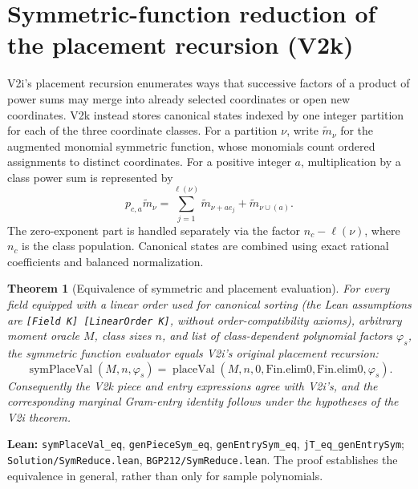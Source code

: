\documentclass[11pt]{article}
\newtheorem{theorem}{Theorem}[section]
\newcommand{\code}[1]{\texttt{#1}}
\begin{document}
\section{Symmetric-function reduction of the placement recursion (V2k)}\label{sec:v2k}
V2i's placement recursion enumerates ways that successive factors of a
product of power sums may merge into already selected coordinates or open
new coordinates. V2k instead stores canonical states indexed by one integer
partition for each of the three coordinate classes. For a partition $\nu$,
write $\widetilde m_\nu$ for the augmented monomial symmetric function,
whose monomials count ordered assignments to distinct coordinates. For a
positive integer $a$, multiplication by a class power sum is represented by
\begin{equation}\label{eq:v2k-transition}
 p_{c,a}\widetilde m_\nu
 =\sum_{j=1}^{\ell(\nu)}\widetilde m_{\nu+a e_j}
  +\widetilde m_{\nu\cup(a)}.
\end{equation}
The zero-exponent part is handled separately via the factor
$n_c-\ell(\nu)$, where $n_c$ is the class population. Canonical states
are combined using exact rational coefficients and balanced normalization.

\begin{theorem}[Equivalence of symmetric and placement evaluation]\label{thm:v2k-sym}
For every field equipped with a linear order used for canonical sorting
(the Lean assumptions are \code{[Field K] [LinearOrder K]}, without
order-compatibility axioms), arbitrary moment oracle $M$, class sizes $n$,
and list of class-dependent polynomial factors $\varphi_s$, the symmetric
function evaluator equals V2i's original placement recursion:
\[
 \operatorname{symPlaceVal}(M,n,\varphi_s)
 =\operatorname{placeVal}(M,n,0,\mathrm{Fin.elim0},
                  \mathrm{Fin.elim0},\varphi_s).
\]
Consequently the V2k piece and entry expressions agree with V2i's,
and the corresponding marginal Gram-entry identity follows under the
hypotheses of the V2i theorem.
\end{theorem}
\noindent\textbf{Lean:} \code{symPlaceVal\_eq},
\code{genPieceSym\_eq}, \code{genEntrySym\_eq},
\code{jT\_eq\_genEntrySym};
\nolinkurl{Solution/SymReduce.lean}, \nolinkurl{BGP212/SymReduce.lean}.
The proof establishes the equivalence in general, rather than only for
sample polynomials.
\end{document}
